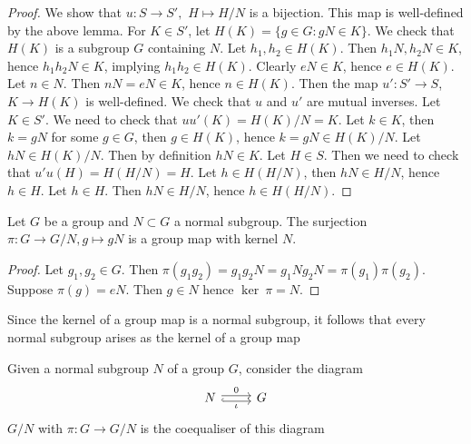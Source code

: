 \begin{proof}
    We show that $u : S \rightarrow S',$ $H \mapsto H/N$ is a bijection. This map is well-defined by the above lemma. For $K \in S'$, let $H(K) = \{ g\in G : gN \in K\}$. We check that $H(K)$ is a subgroup $G$ containing $N$. Let $h_1,h_2\in H(K)$. Then $h_1N,h_2N\in K$, hence $h_1h_2N\in K$, implying $h_1h_2\in H(K)$. Clearly $eN \in K$, hence $e \in H(K)$. Let $n\in N$. Then $nN = eN \in K$, hence $n\in H(K)$. Then the map $u' : S' \rightarrow S$, $K \rightarrow H(K)$ is well-defined. We check that $u$ and $u'$ are mutual inverses. Let $K \in S'$. We need to check that $uu'(K)=H(K)/N = K$. Let $k \in K$, then $k = gN$ for some $g\in G$, then $g\in H(K)$, hence $k=gN \in H(K)/N$. Let $hN \in H(K)/N$. Then by definition $hN \in K$. Let $H \in S$. Then we need to check that $u'u(H) = H(H/N) = H$. Let $h \in H(H/N)$, then $hN \in H/N$, hence $h\in H$. Let $h \in H$. Then $hN\in H/N$, hence $h \in H(H/N).$ 
\end{proof}
\begin{proposition}
    Let $G$ be a group and $N\subset G$ a normal subgroup. The surjection $\pi : G\rightarrow G/N, g\mapsto gN$ is a group map with kernel $N$.
\end{proposition}
\begin{proof}
    Let $g_1,g_2\in G$. Then $\pi(g_1g_2)=g_1g_2N= g_1Ng_2N=\pi(g_1)\pi(g_2)$. Suppose $\pi(g) = eN$. Then $g\in N$ hence $\ker \ \pi = N$. 
\end{proof}   
\begin{corollary}
    Since the kernel of a group map is a normal subgroup, it follows that every normal subgroup arises as the kernel of a group map
\end{corollary} 
\begin{theorem}
    Given a normal subgroup $N$ of a group $G$, consider the diagram
    $$
        \begin{tikzcd}
            N \arrow[r, hookrightarrow, shift right=0.5ex, "\iota", swap] \arrow[r, shift left=0.5ex,"0"] & G 
        \end{tikzcd}  
    $$
    $G/N$ with $\pi : G \rightarrow G/N$ is the coequaliser of this diagram
\end{theorem}

